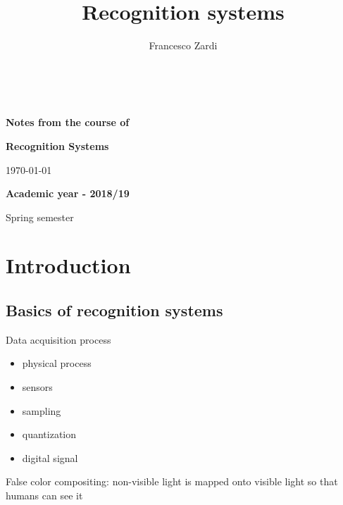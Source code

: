 \documentclass[oneside,onecolumn]{report}
\title{Recognition systems}
\author{Francesco Zardi}
\begin{document}
\begin{titlepage}\

        \vfill

        \begin{center}
            \huge \bfseries Notes from the course of \\
        \end{center}

        \begin{center}
            \huge \bfseries Recognition Systems \\
        \end{center}

        \vskip2cm

        \begin{center} \large
            \today
        \end{center}

        \vfill


    \vfill

    {
        \bfseries
        Academic year - 2018/19

        Spring semester
    }
\end{titlepage}


\renewcommand{\thepage}{\roman{page}}
\tableofcontents

\clearpage

\renewcommand{\thepage}{\arabic{page}} %
\setcounter{page}{1} %

\setlength{\parindent}{0cm}


\chapter{Introduction}
\section{Basics of recognition systems}

Data acquisition process
\begin{itemize}
    \item physical process
    \item sensors
    \item sampling
    \item quantization
    \item digital signal
\end{itemize}

False color compositing: non-visible light is mapped onto visible light so that humans can see it
\end{document}
